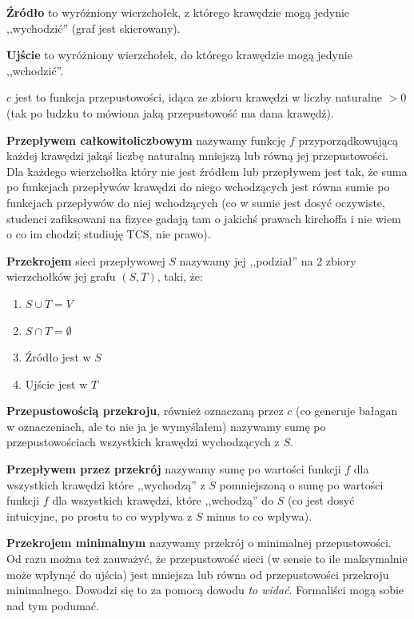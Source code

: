     \textbf{Źródło} to wyróżniony wierzchołek, z którego krawędzie mogą jedynie ,,wychodzić'' (graf jest skierowany).
    
    \textbf{Ujście} to wyróżniony wierzchołek, do którego krawędzie mogą jedynie ,,wchodzić''.

    \textbf{$c$} jest to funkcja przepustowości, idąca ze zbioru krawędzi w liczby naturalne $>0$ (tak po ludzku to mówiona jaką przepustowość ma dana krawędź). 

    \textbf{Przepływem całkowitoliczbowym} nazywamy funkcję $f$ przyporządkowującą każdej krawędzi jakąś liczbę naturalną mniejszą lub równą jej przepustowości. Dla każdego wierzchołka który nie jest źródłem lub przepływem jest tak, że suma po funkcjach przepływów krawędzi do niego wchodzących jest równa sumie po funkcjach przepływów do niej wchodzących (co w sumie jest dosyć oczywiste, studenci zafiksowani na fizyce gadają tam o jakichś prawach kirchoffa i nie wiem o co im chodzi; studiuję TCS, nie prawo). 

    \textbf{Przekrojem} sieci przepływowej $S$ nazywamy jej ,,podział'' na 2 zbiory wierzchołków jej grafu $(S,T)$, taki, że: \begin{enumerate}
        \item $S \cup T = V$
        \item $S \cap T = \emptyset$
        \item Źródło jest w $S$
        \item Ujście jest w $T$
    \end{enumerate} 
    
    \textbf{Przepustowością przekroju}, również oznaczaną przez $c$ (co generuje bałagan w oznaczeniach, ale to nie ja je wymyślałem) nazywamy sumę po przepustowościach wszystkich krawędzi wychodzących z $S$.  
    
    \textbf{Przepływem przez przekrój} nazywamy sumę po wartości funkcji $f$ dla wszystkich krawędzi które ,,wychodzą'' z $S$ pomniejszoną o sumę po wartości funkcji $f$ dla wszystkich krawędzi, które ,,wchodzą'' do $S$ (co jest dosyć intuicyjne, po prostu to co wypływa z $S$ minus to co wpływa). 

    
    \textbf{Przekrojem minimalnym} nazywamy przekrój o minimalnej przepustowości. Od razu można też zauważyć, że przepustowość sieci (w sensie to ile maksymalnie może wpłynąć do ujścia) jest mniejsza lub równa od przepustowości przekroju minimalnego. Dowodzi się to za pomocą dowodu \textit{to widać}. Formaliści mogą sobie nad tym podumać. 

